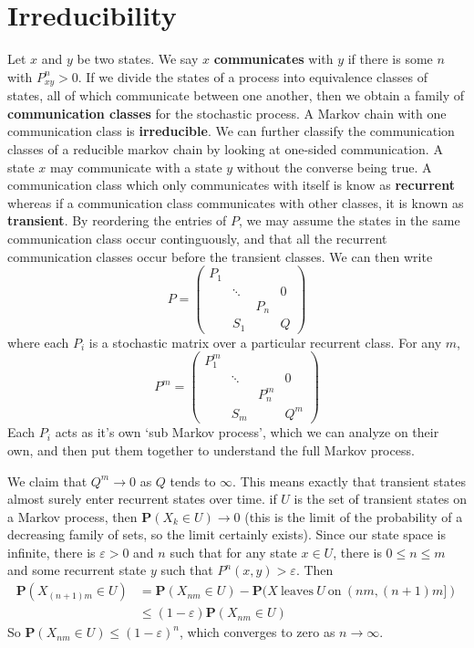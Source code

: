 \section{Irreducibility}

Let $x$ and $y$ be two states. We say $x$ {\bf communicates} with $y$ if there is some $n$ with $P^n_{xy} > 0$. If we divide the states of a process into equivalence classes of states, all of which communicate between one another, then we obtain a family of {\bf communication classes} for the stochastic process. A Markov chain with one communication class is {\bf irreducible}. We can further classify the communication classes of a reducible markov chain by looking at one-sided communication. A state $x$ may communicate with a state $y$ without the converse being true. A communication class which only communicates with itself is know as {\bf recurrent} whereas if a communication class communicates with other classes, it is known as {\bf transient}. By reordering the entries of $P$, we may assume the states in the same communication class occur continguously, and that all the recurrent communication classes occur before the transient classes. We can then write
%
\[ P = \begin{pmatrix} P_1 & & & \\ &\ddots & & 0 \\  & & P_n & \\ & S_1 & & Q \end{pmatrix} \]
%
where each $P_i$ is a stochastic matrix over a particular recurrent class. For any $m$,
%
\[ P^m = \begin{pmatrix} P_1^m & & & \\ &\ddots & & 0 \\  & & P^m_n & \\ & S_m & & Q^m \end{pmatrix} \]
%
Each $P_i$ acts as it's own `sub Markov process', which we can analyze on their own, and then put them together to understand the full Markov process.

We claim that $Q^m \to 0$ as $Q$ tends to $\infty$. This means exactly that transient states almost surely enter recurrent states over time. if $U$ is the set of transient states on a Markov process, then $\mathbf{P}(X_k \in U) \to 0$ (this is the limit of the probability of a decreasing family of sets, so the limit certainly exists). Since our state space is infinite, there is $\varepsilon > 0$ and $n$ such that for any state $x \in U$, there is $0 \leq n \leq m$ and some recurrent state $y$ such that $P^n(x,y) > \varepsilon$. Then
%
\begin{align*}
    \mathbf{P}(X_{(n+1)m} \in U) &= \mathbf{P}(X_{nm} \in U) - \mathbf{P}(X\ \text{leaves}\ U\ \text{on}\ (nm,(n+1)m])\\
    &\leq (1 - \varepsilon) \mathbf{P}(X_{nm} \in U)
\end{align*}
%
So $\mathbf{P}(X_{nm} \in U) \leq (1 - \varepsilon)^n$, which converges to zero as $n \to \infty$.

